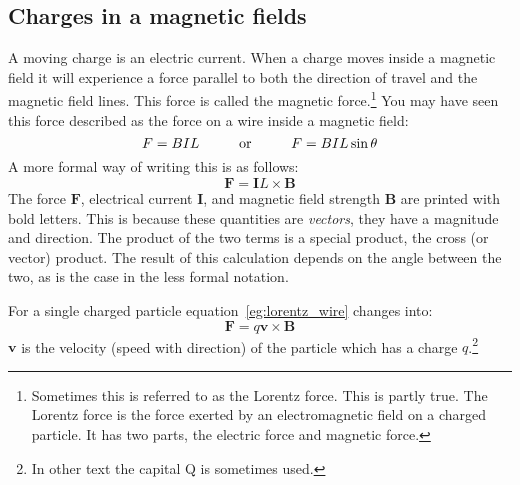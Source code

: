 \subsection{Charges in a magnetic fields}
A moving charge is an electric current. When a charge moves inside a magnetic field it will experience a force parallel to both the direction of travel and the magnetic field lines. This force is called the magnetic force.\footnote{Sometimes this is referred to as the Lorentz force. This is partly true. The Lorentz force is the force exerted by an electromagnetic field on a charged particle. It has two parts, the electric force and magnetic force.} You may have seen this force described as the force on a wire inside a magnetic field:
\begin{equation*}
F=BIL \hspace{10 mm} \mbox{or} \hspace{10 mm} F=BIL \sin \theta
\end{equation*}
A more formal way of writing this is as follows:
\begin{equation}
\mathbf{F}=\mathbf{I}L \times \mathbf{B} \label{eg:lorentz_wire}
\end{equation}
The force $\mathbf{F}$, electrical current $\mathbf{I}$, and magnetic field strength $\mathbf{B}$ are printed with bold letters. This is because these quantities are \textit{vectors}, they have a magnitude and direction. The product of the two terms is a special product, the cross (or vector) product. The result of this calculation depends on the angle between the two, as is the case in the less formal notation. 

For a single charged particle equation~\ref{eg:lorentz_wire} changes into:
\begin{equation}
\mathbf{F}=q\mathbf{v \times B} \label{eq:lorentz}
\end{equation}
$\mathbf{v}$ is the velocity (speed with direction) of the particle which has a charge $q$.\footnote{In other text the capital Q is sometimes used.}

